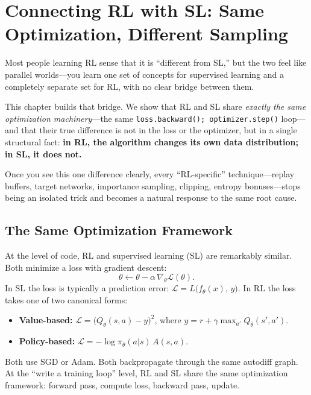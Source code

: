 \chapter{Connecting RL with SL: Same Optimization, Different Sampling}
\label{ch:connecting-rl-sl}

Most people learning RL sense that it is ``different from SL,'' but the two feel like parallel worlds---you learn one set of concepts for supervised learning and a completely separate set for RL, with no clear bridge between them.

This chapter builds that bridge. We show that RL and SL share \emph{exactly the same optimization machinery}---the same \texttt{loss.backward(); optimizer.step()} loop---and that their true difference is not in the loss or the optimizer, but in a single structural fact: \textbf{in RL, the algorithm changes its own data distribution; in SL, it does not.}

Once you see this one difference clearly, every ``RL-specific'' technique---replay buffers, target networks, importance sampling, clipping, entropy bonuses---stops being an isolated trick and becomes a natural response to the same root cause.

\section{The Same Optimization Framework}

At the level of code, RL and supervised learning (SL) are remarkably similar.
Both minimize a loss with gradient descent:
%
\begin{equation}
\theta \leftarrow \theta - \alpha\,\nabla_\theta \mathcal{L}(\theta).
\end{equation}
%
In SL the loss is typically a prediction error:
$\mathcal{L} = L\bigl(f_\theta(x),\, y\bigr)$.
In RL the loss takes one of two canonical forms:
%
\begin{itemize}
    \item \textbf{Value-based:}
        $\mathcal{L} = \bigl(Q_\theta(s,a) - y\bigr)^2$,
        where $y = r + \gamma \max_{a'} Q_{\bar\theta}(s',a')$.
    \item \textbf{Policy-based:}
        $\mathcal{L} = -\log\pi_\theta(a|s)\,A(s,a)$.
\end{itemize}
%
Both use SGD or Adam.  Both backpropagate through the same autodiff graph.
At the ``write a training loop'' level, RL and SL share the same optimization framework:
forward pass, compute loss, backward pass, update.


